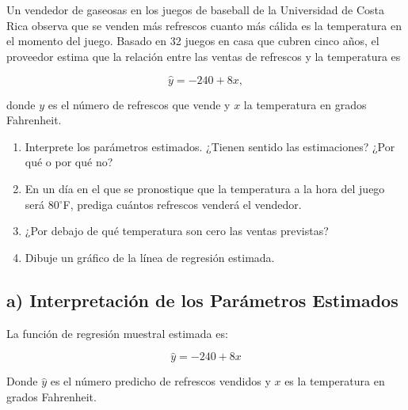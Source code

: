 \documentclass[12pt]{article}
\begin{document}
Un vendedor de gaseosas en los juegos de baseball de la Universidad de Costa Rica observa que se venden más refrescos cuanto más cálida es la temperatura en el momento del juego. Basado en 32 juegos en casa que cubren cinco años, el proveedor estima que la relación entre las ventas de refrescos y la temperatura es

\[
\hat{y} = -240 + 8x,
\]

donde $y$ es el número de refrescos que vende y $x$ la temperatura en grados Fahrenheit.

\begin{enumerate}[label=\alph*)]
    \item Interprete los parámetros estimados. ¿Tienen sentido las estimaciones? ¿Por qué o por qué no?
    \item En un día en el que se pronostique que la temperatura a la hora del juego será 80$^\circ$F, prediga cuántos refrescos venderá el vendedor.
    \item ¿Por debajo de qué temperatura son cero las ventas previstas?
    \item Dibuje un gráfico de la línea de regresión estimada.
\end{enumerate}

\subsection*{a) Interpretación de los Parámetros Estimados}

La función de regresión muestral estimada es:  

\[
\hat{y} = -240 + 8x
\]

Donde $\hat{y}$ es el número predicho de refrescos vendidos y $x$ es la temperatura en grados Fahrenheit.  
\end{document}
